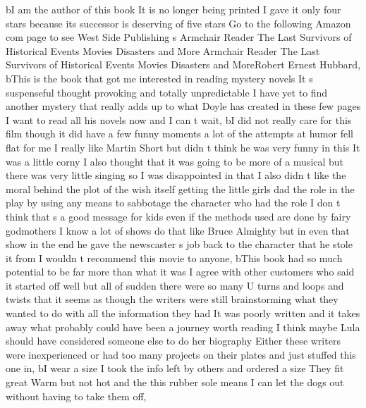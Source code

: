 \documentclass[
]{article}
\newenvironment{Shaded}{}{}
\newcommand{\NormalTok}[1]{#1}
\newcommand{\StringTok}[1]{\textcolor[rgb]{0.25,0.44,0.63}{#1}}
\begin{document}
\begin{Shaded}
\begin{Highlighting}[]
\NormalTok{       b}\StringTok{\textquotesingle{}I am the author of this book It is no longer being printed I gave it only four stars because its successor is deserving of five stars Go to the following Amazon com page to see West Side Publishing s Armchair Reader The Last Survivors of Historical Events Movies Disasters and More Armchair Reader The Last Survivors of Historical Events Movies Disasters and MoreRobert Ernest Hubbard\textquotesingle{}}\NormalTok{,}
\NormalTok{       b}\StringTok{\textquotesingle{}This is the book that got me interested in reading mystery novels It s suspenseful thought provoking and totally unpredictable I have yet to find another mystery that really adds up to what Doyle has created in these few pages I want to read all his novels now and I can t wait\textquotesingle{}}\NormalTok{,}
\NormalTok{       b}\StringTok{\textquotesingle{}I did not really care for this film though it did have a few funny moments a lot of the attempts at humor fell flat for me I really like Martin Short but didn t think he was very funny in this It was a little corny I also thought that it was going to be more of a musical but there was very little singing so I was disappointed in that I also didn t like the moral behind the plot of the wish itself getting the little girls dad the role in the play by using any means to sabbotage the character who had the role I don t think that s a good message for kids even if the methods used are done by fairy godmothers I know a lot of shows do that like Bruce Almighty but in even that show in the end he gave the newscaster s job back to the character that he stole it from I wouldn t recommend this movie to anyone\textquotesingle{}}\NormalTok{,}
\NormalTok{       b}\StringTok{\textquotesingle{}This book had so much potential to be far more than what it was I agree with other customers who said it started off well but all of sudden there were so many U turns and loops and twists that it seems as though the writers were still brainstorming what they wanted to do with all the information they had It was poorly written and it takes away what probably could have been a journey worth reading I think maybe Lula should have considered someone else to do her biography Either these writers were inexperienced or had too many projects on their plates and just stuffed this one in\textquotesingle{}}\NormalTok{,}
\NormalTok{       b}\StringTok{\textquotesingle{}I wear a size I took the info left by others and ordered a size They fit great Warm but not hot and the this rubber sole means I can let the dogs out without having to take them off\textquotesingle{}}\NormalTok{,}

\end{Highlighting}
\end{Shaded}
\end{document}
